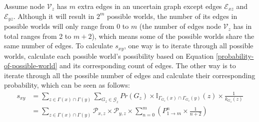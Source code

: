 \documentclass[\main/thesis.tex]{subfiles}
\begin{document}
Assume node $\mathcal{V}_z$ has $m$ extra edges in an uncertain graph except edges $\mathcal{E}_{xz}$ and $\mathcal{E}_{yz}$. Although it will result in $2^m$ possible worlds, the number of its edges in possible worlds will only range from 0 to $m$ (the number of edges node $\mathcal{V}_z$ has in total ranges from 2 to $m+2$), which means some of the possible worlds share the same number of edges. To calculate $s_{xy}$, one way is to iterate through all possible worlds, calculate each possible world's possibility based on Equation \ref{probability-of-possible-world} and its corresponding count of edges. The other way is to iterate through all the possible number of edges and calculate their corresponding probability, which can be seen as follows:
\begin{align*}
s_{xy}&=\sum_{z\in \Gamma(x)\cap\Gamma(y)}\sum_{{G_z}\in \mathcal{G}_z}Pr({G_z})\times\mathbb{I}_{\Gamma_{G_z}(x)\cap\Gamma_{G_z}(y)}(z)\times \frac{1}{k_{G_z}(z)}\\
&=\sum_{z\in \Gamma(x)\cap\Gamma(y)}\mathcal{P}_{x,z}\times\mathcal{P}_{y,z} \times \sum_{n=0}^{m}(P_{1\rightarrow m}^n \times \frac{1}{n+2})
\end{align*}


\end{document}
